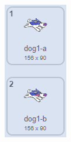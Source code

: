 \documentclass[10pt, a4paper]{article}
\begin{document}
\begin{enumerate}
        \begin{figure}[htbp]
            \centering
            \begin{minipage}[t]{.23\textwidth}
                \centering
                \begin{minipage}[t]{.45\textwidth}
                    \centering
                    \includegraphics[width=\textwidth]{27-1.png}

\end{minipage}
\end{minipage}
\end{figure}
\end{enumerate}
\end{document}
